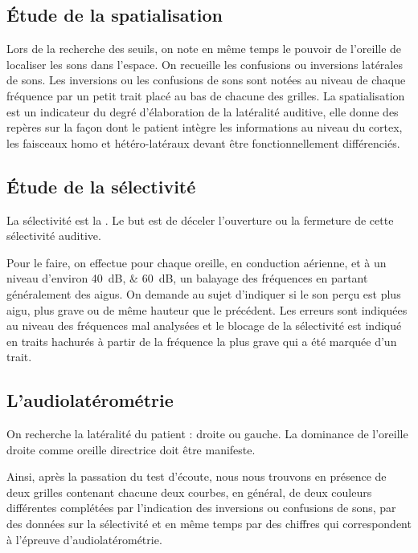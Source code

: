 \subsection{\'Etude de la spatialisation}

Lors de la recherche des seuils, on note en même temps le pouvoir
de l'oreille de localiser les sons dans l'espace. On recueille les
confusions ou inversions latérales de sons. Les inversions ou les
confusions de sons sont notées au niveau de chaque fréquence par un
petit trait placé au bas de chacune des grilles. La spatialisation
est un indicateur du degré d'élaboration de la latéralité auditive,
elle donne des repères sur la façon dont le patient intègre les informations
au niveau du cortex, les faisceaux homo et hétéro-latéraux devant
être fonctionnellement différenciés. 


\subsection{\'Etude de la sélectivité}

La sélectivité est la \autocite{tomatis:loreille}.
Le but est de déceler l'ouverture ou la fermeture de cette sélectivité
auditive. 

Pour le faire, on effectue pour chaque oreille, en conduction
aérienne, et à un niveau d'environ \SIlist{40;60}{\dB}, un balayage des
fréquences en partant généralement des aigus. On demande au sujet
d'indiquer si le son perçu est plus aigu, plus grave ou de même hauteur
que le précédent. Les erreurs sont indiquées au niveau des fréquences
mal analysées et le blocage de la sélectivité est indiqué en traits
hachurés à partir de la fréquence la plus grave qui a été marquée
d'un trait. 
\subsection{L'audiolatérométrie}

On recherche la latéralité du patient : droite ou gauche. La dominance
de l'oreille droite comme oreille directrice doit être manifeste.

Ainsi, après la passation du test d\textquoteright écoute, nous nous
trouvons en présence de deux grilles contenant chacune deux courbes,
en général, de deux couleurs différentes complétées par l'indication
des inversions ou confusions de sons, par des données sur la sélectivité
et en même temps par des chiffres qui correspondent à l'épreuve d'audiolatérométrie.




